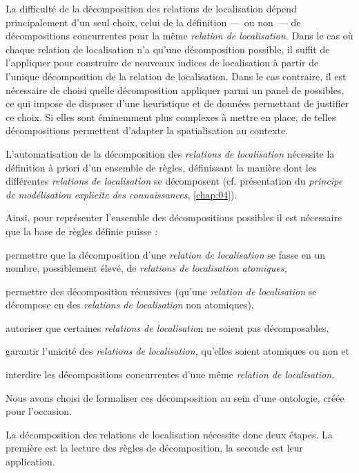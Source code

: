 La difficulté de la décomposition des relations de localisation dépend
principalement d'un seul choix, celui de la définition ---~ou non~---
de décompositions concurrentes pour la même \emph{relation de
  localisation.} Dans le cas où chaque relation de localisation n'a
qu'une décomposition possible, il suffit de l'appliquer pour
construire de nouveaux indices de localisation à partir de l'unique
décomposition de la relation de localisation. Dans le cas contraire,
il est nécessaire de choisi quelle décomposition appliquer parmi un
panel de possibles, ce qui impose de disposer d'une heuristique et de
données permettant de justifier ce choix. Si elles sont éminemment
plus complexes à mettre en place, de telles décompositions permettent
d’adapter la spatialisation au contexte.


L'automatisation de la décomposition des \emph{relations de
  localisation} nécessite la définition à priori d'un ensemble de
règles, définissant la manière dont les différentes \emph{relations de
  localisation} se décomposent (cf. présentation du \emph{principe de
  modélisation explicite des connaissances}, \autoref{chap:04}). 

Ainsi, pour représenter l'ensemble des décompositions possibles il est
nécessaire que la base de règles définie puisse :
\begin{enumerate*}[label=(\arabic*)]
\item permettre que la décomposition d'une \emph{relation de
    localisation} se fasse en un nombre, possiblement élevé, de
  \emph{relations de localisation atomiques,}
\item permettre des décomposition récursives (\ie qu'une
  \emph{relation de localisation} se décompose en des \emph{relations
    de localisation} non atomiques),
\item autoriser que certaines \emph{relations de localisatio}n ne soient pas
  décomposables,
\item garantir l'unicité des \emph{relations de localisation,}
  qu'elles soient atomiques ou non et
\item interdire les décompositions concurrentes d'une même
  \emph{relation de localisation.}
\end{enumerate*}


Nous avons choisi de formaliser ces décomposition
au sein d'une ontologie, créée pour l'occasion.

La décomposition des relations de localisation nécessite donc deux
étapes. La première est la lecture des règles de décomposition, la
seconde est leur application.


